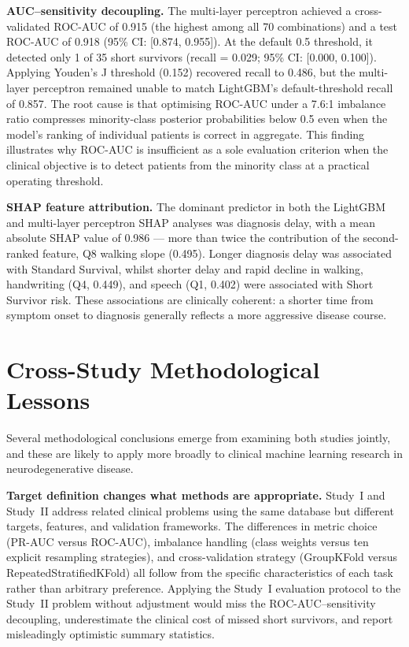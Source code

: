 \textbf{AUC--sensitivity decoupling.} The multi-layer perceptron achieved a cross-validated \gls{ROC-AUC} of 0.915 (the highest among all 70 combinations) and a test \gls{ROC-AUC} of 0.918 (95\% \gls{CI}: [0.874, 0.955]). At the default 0.5 threshold, it detected only 1 of 35 short survivors (recall = 0.029; 95\% \gls{CI}: [0.000, 0.100]). Applying Youden's J threshold (0.152) recovered recall to 0.486, but the multi-layer perceptron remained unable to match LightGBM's default-threshold recall of 0.857. The root cause is that optimising \gls{ROC-AUC} under a 7.6:1 imbalance ratio compresses minority-class posterior probabilities below 0.5 even when the model's ranking of individual patients is correct in aggregate. This finding illustrates why \gls{ROC-AUC} is insufficient as a sole evaluation criterion when the clinical objective is to detect patients from the minority class at a practical operating threshold.

\textbf{\gls{SHAP} feature attribution.} The dominant predictor in both the LightGBM and multi-layer perceptron \gls{SHAP} analyses was diagnosis delay, with a mean absolute \gls{SHAP} value of 0.986 --- more than twice the contribution of the second-ranked feature, Q8 walking slope (0.495). Longer diagnosis delay was associated with Standard Survival, whilst shorter delay and rapid decline in walking, handwriting (Q4, 0.449), and speech (Q1, 0.402) were associated with Short Survivor risk. These associations are clinically coherent: a shorter time from symptom onset to diagnosis generally reflects a more aggressive disease course.

\section{Cross-Study Methodological Lessons}
\label{sec:conclusion_lessons}

Several methodological conclusions emerge from examining both studies jointly, and these are likely to apply more broadly to clinical machine learning research in neurodegenerative disease.

\textbf{Target definition changes what methods are appropriate.} Study~I and Study~II address related clinical problems using the same database but different targets, features, and validation frameworks. The differences in metric choice (\gls{PR-AUC} versus \gls{ROC-AUC}), imbalance handling (class weights versus ten explicit resampling strategies), and cross-validation strategy (GroupKFold versus RepeatedStratifiedKFold) all follow from the specific characteristics of each task rather than arbitrary preference. Applying the Study~I evaluation protocol to the Study~II problem without adjustment would miss the \gls{ROC-AUC}--sensitivity decoupling, underestimate the clinical cost of missed short survivors, and report misleadingly optimistic summary statistics.

